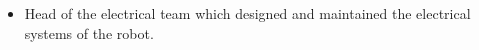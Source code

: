 \documentclass[]{deedy-resume-openfont}
\begin{document}
\begin{minipage}[t]{0.66\textwidth}
\sectionsep

\begin{itemize}
    \setlength\itemsep{0pt}
    \item Head of the electrical team which designed and maintained the electrical systems of the robot.
\end{itemize}
 

\sectionsep

\end{minipage} 
\end{document}
